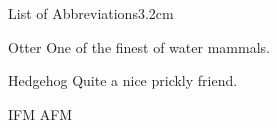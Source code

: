 \begin{mclistof}{List of Abbreviations}{3.2cm}

  \item[Otter] One of the finest of water mammals.

  \item[Hedgehog] Quite a nice prickly friend.

\end{mclistof}

IFM
AFM

